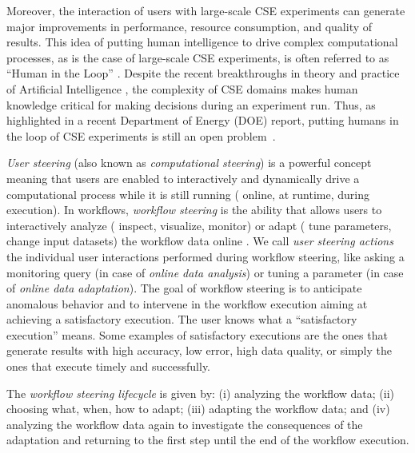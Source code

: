 
Moreover, the interaction of users with large-scale CSE experiments can generate major improvements in performance, resource consumption, and quality of results.  
This idea of putting human intelligence to drive complex computational processes, as is the case of large-scale CSE experiments, is often referred to as ``Human in the Loop'' \cite{jagadish_big_2014}.
Despite the recent breakthroughs in theory and practice of Artificial Intelligence \cite{russell2016artificial}, the complexity of CSE domains makes human knowledge critical for making decisions during an experiment run. Thus, as highlighted in a recent Department of Energy (DOE) report, putting humans in the loop of CSE experiments is still an open problem~\cite{deelman_future_2017}.

\textit{User steering} (also known as \textit{computational steering}) is a powerful concept meaning that users are enabled to interactively and dynamically drive a computational process while it is still running (\ie{} online, at runtime, during execution).  In workflows, \textit{workflow steering} is the ability that allows users to interactively analyze (\eg{} inspect, visualize, monitor) or adapt (\eg{} tune parameters, change input datasets) the workflow data online \cite{Mattoso2015Dynamic, Souza2017Data}. We call \textit{user steering actions}
the individual user interactions performed during workflow steering, like asking a monitoring query (in case of \textit{online data analysis}) or tuning a parameter (in case of \textit{online data adaptation}).
The goal of workflow steering is to anticipate anomalous behavior and to intervene in the workflow execution aiming at achieving a satisfactory execution. 
The user knows what a ``satisfactory execution'' means. Some examples of satisfactory executions are the ones that generate results with high accuracy, low error, high data quality, or simply the ones that execute timely and successfully.

The \textit{workflow steering lifecycle} is given by:
(i) analyzing the workflow data;
(ii) choosing what, when, how to adapt; 
(iii) adapting the workflow data; and
(iv) analyzing the workflow data again to investigate the consequences of the adaptation and returning to the first step until the end of the workflow execution.


